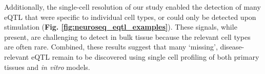 Additionally, the single-cell resolution of our study enabled the detection of many eQTL that were specific to individual cell types, or could only be detected upon stimulation (\textbf{Fig. \ref{fig:neuroseq_eqtl_examples}}).
These signals, while present, are challenging to detect in bulk tissue because the relevant cell types are often rare. 
Combined, these results suggest that many `missing', disease-relevant eQTL remain to be discovered using single cell profiling of both primary tissues and \textit{in vitro} models.\\





